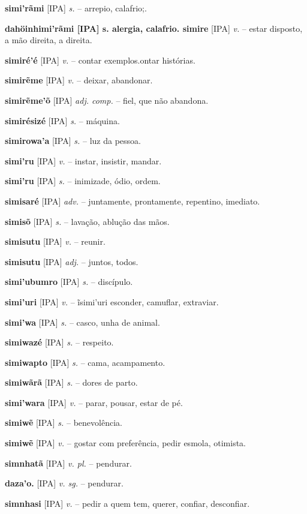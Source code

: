 {\textbf{simi'rãmi} [IPA] \textit{s.} -- arrepio, calafrio;.

\textbf{dahöinhimi'rãmi [IPA] s. alergia, calafrio. simire} [IPA] \textit{v.} -- estar disposto, a mão direita, a direita.

\textbf{simiré'é} [IPA] \textit{v.} -- contar exemplos.ontar histórias.

\textbf{simirẽme} [IPA] \textit{v.} -- deixar, abandonar.

\textbf{simirẽme'õ} [IPA] \textit{adj. comp.} -- fiel, que não abandona.

\textbf{simirésizé} [IPA] \textit{s.} -- máquina.

\textbf{simirowa'a} [IPA] \textit{s.} -- luz da pessoa.

\textbf{simi'ru} [IPA] \textit{v.} -- instar, insistir, mandar.

\textbf{simi'ru} [IPA] \textit{s.} -- inimizade, ódio, ordem.

\textbf{simisaré} [IPA] \textit{adv.} -- juntamente, prontamente, repentino, imediato.

\textbf{simisõ} [IPA] \textit{s.} -- lavação, ablução das mãos.

\textbf{simisutu} [IPA] \textit{v.} -- reunir.

\textbf{simisutu} [IPA] \textit{adj.} -- juntos, todos.

\textbf{simi'ubumro} [IPA] \textit{s.} -- discípulo.

\textbf{simi'uri} [IPA] \textit{v.} -- ĩsimi'uri esconder, camuflar, extraviar.

\textbf{simi'wa} [IPA] \textit{s.} -- casco, unha de animal.

\textbf{simiwazé} [IPA] \textit{s.} -- respeito.

\textbf{simiwapto} [IPA] \textit{s.} -- cama, acampamento.

\textbf{simiwãrã} [IPA] \textit{s.} -- dores de parto.

\textbf{simi'wara} [IPA] \textit{v.} -- parar, pousar, estar de pé.

\textbf{simiwẽ} [IPA] \textit{s.} -- benevolência.

\textbf{simiwẽ} [IPA] \textit{v.} -- gostar com preferência, pedir esmola, otimista.

\textbf{simnhatã} [IPA] \textit{v. pl.} -- pendurar.

\textbf{daza'o.} [IPA] \textit{v. sg.} -- pendurar.

\textbf{simnhasi} [IPA] \textit{v.} -- pedir a quem tem, querer, confiar, desconfiar.

}
